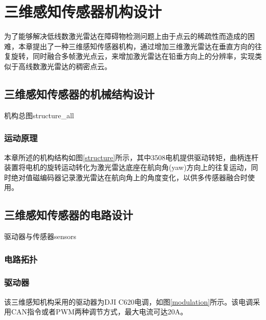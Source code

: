 
\chapter{三维感知传感器机构设计}
为了能够解决低线数激光雷达在障碍物检测问题上由于点云的稀疏性而造成的困难，本章提出了一种三维感知传感器机构，通过增加三维激光雷达在垂直方向的往复旋转，同时融合多帧激光点云，来增加激光雷达在铅垂方向上的分辨率，实现类似于高线数激光雷达的稠密点云。

\section{三维感知传感器的机械结构设计}
\begin{pics}[htbp]{机构总图}{structure_all}
\end{pics}
\subsection{运动原理}
本章所述的机构结构如图\ref{structure}所示，其中3508电机提供驱动转矩，曲柄连杆装置将电机的旋转运动转化为激光雷达底座在航向角(yaw)方向上的往复运动，同时绝对值磁编码器记录激光雷达在航向角上的角度变化，以供多传感器融合时使用。

\section{三维感知传感器的电路设计}

\begin{pics}[htbp]{驱动器与传感器}{sensors}
\end{pics}

\subsection{电路拓扑}

\subsection{驱动器}
该三维感知机构采用的驱动器为DJI C620电调，如图\ref{modulation}所示。该电调采用CAN指令或者PWM两种调节方式，最大电流可达20A。

